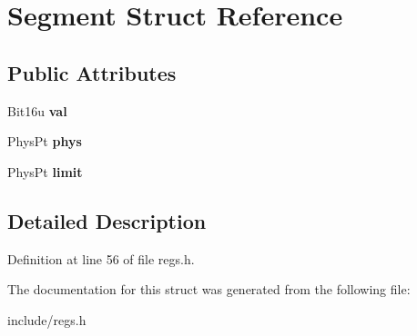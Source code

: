 \hypertarget{structSegment}{\section{Segment Struct Reference}
\label{structSegment}
}
\subsection*{Public Attributes}
\begin{DoxyCompactItemize}
\item 
\hypertarget{structSegment_aaa4a0158b7e42e1d2b550eeafebb6d70}{Bit16u {\bfseries val}}\label{structSegment_aaa4a0158b7e42e1d2b550eeafebb6d70}

\item 
\hypertarget{structSegment_a1203b1d600617ac5afdd6106e0844343}{Phys\-Pt {\bfseries phys}}\label{structSegment_a1203b1d600617ac5afdd6106e0844343}

\item 
\hypertarget{structSegment_a2c9089f9ee657e1c892fb601b68e1615}{Phys\-Pt {\bfseries limit}}\label{structSegment_a2c9089f9ee657e1c892fb601b68e1615}

\end{DoxyCompactItemize}


\subsection{Detailed Description}


Definition at line 56 of file regs.\-h.



The documentation for this struct was generated from the following file\-:\begin{DoxyCompactItemize}
\item 
include/regs.\-h\end{DoxyCompactItemize}
